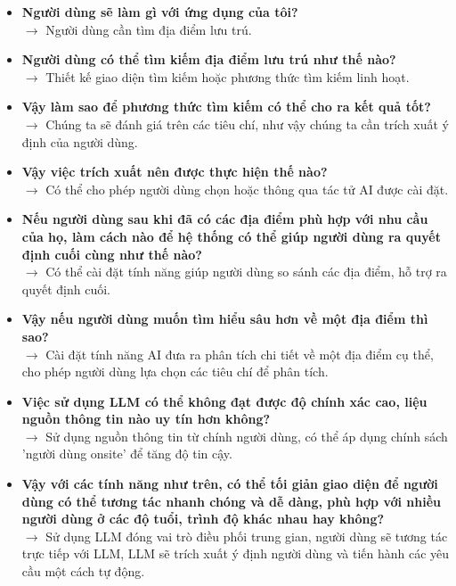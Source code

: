 \documentclass[12pt, a4paper]{article}
\begin{document}
\begin{itemize}[label=\textcolor{blue!70!black}{\faQuestionCircle}, leftmargin=0.5cm]
  \item \textbf{Người dùng sẽ làm gì với ứng dụng của tôi?} \\
  $\rightarrow$ Người dùng cần tìm địa điểm lưu trú.
  
  \item \textbf{Người dùng có thể tìm kiếm địa điểm lưu trú như thế nào?} \\
  $\rightarrow$ Thiết kế giao diện tìm kiếm hoặc phương thức tìm kiếm linh hoạt.

  \item \textbf{Vậy làm sao để phương thức tìm kiếm có thể cho ra kết quả tốt?} \\
  $\rightarrow$ Chúng ta sẽ đánh giá trên các tiêu chí, như vậy chúng ta cần trích xuất ý định của người dùng.

  \item \textbf{Vậy việc trích xuất nên được thực hiện thế nào?} \\
  $\rightarrow$ Có thể cho phép người dùng chọn hoặc thông qua tác tử AI được cài đặt.

  \item \textbf{Nếu người dùng sau khi đã có các địa điểm phù hợp với nhu cầu của họ, làm cách nào để hệ thống có thể giúp người dùng ra quyết định cuối cùng như thế nào?} \\
  $\rightarrow$ Có thể cài đặt tính năng giúp người dùng so sánh các địa điểm, hỗ trợ ra quyết định cuối.

  \item \textbf{Vậy nếu người dùng muốn tìm hiểu sâu hơn về một địa điểm thì sao?} \\
  $\rightarrow$ Cài đặt tính năng AI đưa ra phân tích chi tiết về một địa điểm cụ thể, cho phép người dùng lựa chọn các tiêu chí để phân tích.

  \item \textbf{Việc sử dụng LLM có thể không đạt được độ chính xác cao, liệu nguồn thông tin nào uy tín hơn không?} \\
  $\rightarrow$ Sử dụng nguồn thông tin từ chính người dùng, có thể áp dụng chính sách 'người dùng onsite' để tăng độ tin cậy.

  \item \textbf{Vậy với các tính năng như trên, có thể tối giản giao diện để người dùng có thể tương tác nhanh chóng và dễ dàng, phù hợp với nhiều người dùng ở các độ tuổi, trình độ khác nhau hay không?} \\
  $\rightarrow$ Sử dụng LLM đóng vai trò điều phối trung gian, người dùng sẽ tương tác trực tiếp với LLM, LLM sẽ trích xuất ý định người dùng và tiến hành các yêu cầu một cách tự động.
\end{itemize}
\end{document}
